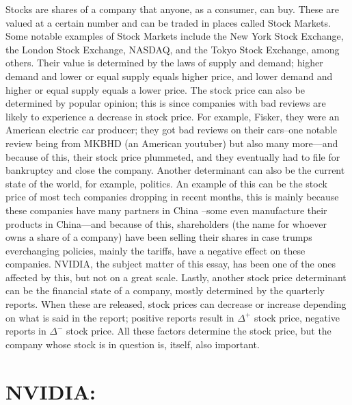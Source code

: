 \documentclass[12pt]{article}
\begin{document}
Stocks are shares of a company that anyone, as a consumer, can buy. These are valued at a certain number and can be traded in places called Stock Markets. Some notable examples of Stock Markets include the New York Stock Exchange, the London Stock Exchange, NASDAQ, and the Tokyo Stock Exchange, among others. Their value is determined by the laws of supply and demand; higher demand and lower or equal supply equals higher price, and lower demand and higher or equal supply equals a lower price. The stock price can also be determined by popular opinion; this is since companies with bad reviews are likely to experience a decrease in stock price. For example, Fisker, they were an American electric car producer; they got bad reviews on their cars--one notable review being from MKBHD (an American youtuber) but also many more—and because of this, their stock price plummeted, and they eventually had to file for bankruptcy and close the company. Another determinant can also be the current state of the world, for example, politics. An example of this can be the stock price of most tech companies dropping in recent months, this is mainly because these companies have many partners in China –some even manufacture their products in China—and because of this, shareholders (the name for whoever owns a share of a company) have been selling their shares in case trumps everchanging policies, mainly the tariffs, have a negative effect on these companies. NVIDIA, the subject matter of this essay, has been one of the ones affected by this, but not on a great scale. Lastly, another stock price determinant can be the financial state of a company, mostly determined by the quarterly reports. When these are released, stock prices can decrease or increase depending on what is said in the report; positive reports result in $\Delta^{+}$ stock price, negative reports in $\Delta^{-}$ stock price. All these factors determine the stock price, but the company whose stock is in question is, itself, also important.

\section{NVIDIA:}
\end{document}
